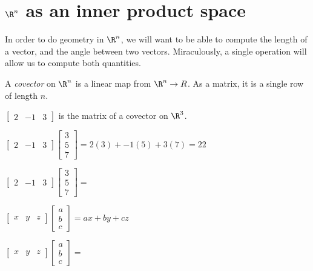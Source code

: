 
\section{$\R^n$ as an inner product space}
In order to do geometry in $\R^n$, we will want to be able to compute the length of a vector, and the angle between two vectors.   Miraculously, a single operation will allow us to
compute both quantities.

\begin{definition}
	A \textit{covector} on $\R^n$ is a linear map from $\R^n \to R$.  As a matrix, it is a single row of length $n$.
\end{definition}

\begin{example}
	$\begin{bmatrix} 2 & -1 & 3 \end{bmatrix}$ is the matrix of a covector on $\R^3$.
\end{example}

\begin{question}
	\begin{solution}
	\begin{hint}
		$\begin{bmatrix} 2 & -1 & 3 \end{bmatrix} \begin{bmatrix} 3\\5\\7 \end{bmatrix} = 2(3)+-1(5)+3(7) = 22$
	\end{hint}
	$\begin{bmatrix} 2 & -1 & 3 \end{bmatrix} \begin{bmatrix} 3\\5\\7 \end{bmatrix} = $
	\end{solution}
\end{question}

\begin{question}
	\begin{hint}
		$\begin{bmatrix} x & y & z \end{bmatrix} \begin{bmatrix} a \\b\\c\end{bmatrix} = ax+by+cz$ 
	\end{hint}
	$\begin{bmatrix} x & y & z \end{bmatrix} \begin{bmatrix} a \\b\\c\end{bmatrix} =$ 
\end{question}

